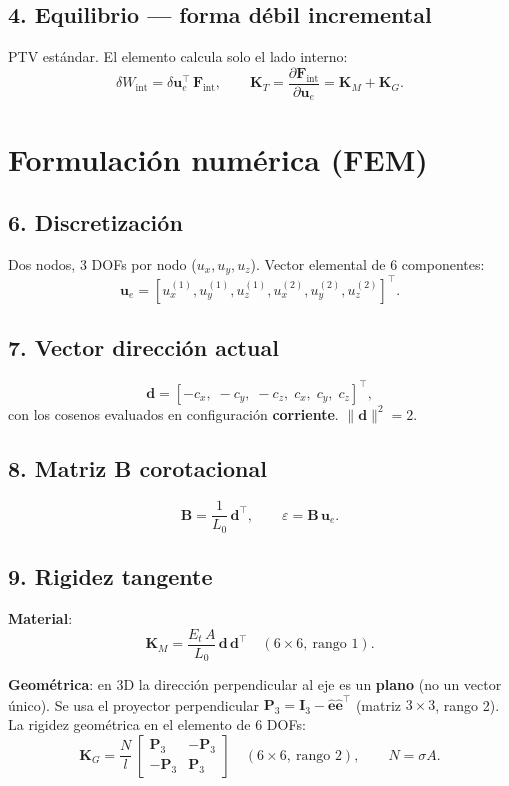 \documentclass[11pt,letterpaper,oneside]{report}
\begin{document}
\subsection{4. Equilibrio --- forma débil incremental}
PTV estándar. El elemento calcula solo el lado interno:
\[
\delta W_{\text{int}} = \delta\mathbf u_e^\top\,\mathbf F_{\text{int}}, \qquad \mathbf K_T = \frac{\partial\mathbf F_{\text{int}}}{\partial\mathbf u_e} = \mathbf K_M + \mathbf K_G.
\]


\section{Formulación numérica (FEM)}

\subsection{6. Discretización}
Dos nodos, 3 DOFs por nodo ($u_x, u_y, u_z$). Vector elemental de 6 componentes:
\[
\mathbf u_e = [u_x^{(1)}, u_y^{(1)}, u_z^{(1)}, u_x^{(2)}, u_y^{(2)}, u_z^{(2)}]^\top.
\]

\subsection{7. Vector dirección actual}
\[
\mathbf d = [-c_x,\; -c_y,\; -c_z,\; c_x,\; c_y,\; c_z]^\top,
\]
con los cosenos evaluados en configuración \textbf{corriente}. $\|\mathbf d\|^2 = 2$.

\subsection{8. Matriz B corotacional}
\[
\mathbf B = \frac{1}{L_0}\,\mathbf d^\top, \qquad \varepsilon = \mathbf B\,\mathbf u_e.
\]

\subsection{9. Rigidez tangente}
\textbf{Material}:
\[
\mathbf K_M = \frac{E_t\,A}{L_0}\,\mathbf d\,\mathbf d^\top \quad (6\times 6,\ \text{rango 1}).
\]

\textbf{Geométrica}: en 3D la dirección perpendicular al eje es un \textbf{plano} (no un vector único). Se usa el proyector perpendicular $\mathbf P_3 = \mathbf I_3 - \hat{\mathbf e}\hat{\mathbf e}^\top$ (matriz $3\times 3$, rango 2). La rigidez geométrica en el elemento de 6 DOFs:
\[
\mathbf K_G = \frac{N}{l}\,\begin{bmatrix}\mathbf P_3 & -\mathbf P_3 \\ -\mathbf P_3 & \mathbf P_3\end{bmatrix} \quad (6\times 6,\ \text{rango 2}), \qquad N = \sigma A.
\]
\end{document}

